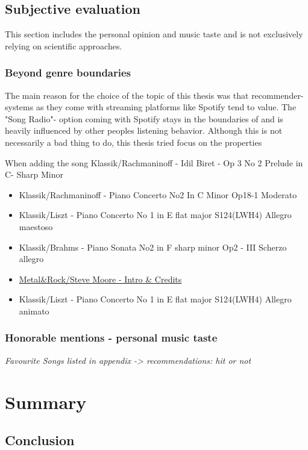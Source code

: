 \section{Subjective evaluation}

This section includes the personal opinion and music taste and is not exclusively relying on scientific approaches. 

\subsection{Beyond genre boundaries}

The main reason for the choice of the topic of this thesis was that recommender-systems as they come with streaming platforms like Spotify tend to value. The "Song Radio"- option coming with Spotify stays in the boundaries of and is heavily influenced by other peoples listening behavior. Although this is not necessarily a bad thing to do, this thesis tried focus on the properties 


When adding the song Klassik/Rachmaninoff - Idil Biret - Op 3 No 2 Prelude in C- Sharp Minor
\begin{itemize}
	\setlength\itemsep{-0.5em}
	\item Klassik/Rachmaninoff - Piano Concerto No2 In C Minor Op18-1 Moderato
	\item Klassik/Liszt - Piano Concerto No 1 in E flat major S124(LWH4) Allegro maestoso
	\item Klassik/Brahms - Piano Sonata No2 in F sharp minor Op2 - III Scherzo allegro
	\item \underline{Metal\&Rock/Steve Moore - Intro \& Credits}
	\item Klassik/Liszt - Piano Concerto No 1 in E flat major S124(LWH4) Allegro animato
\end{itemize}

\subsection{Honorable mentions - personal music taste}

\textit{Favourite Songs listed in appendix -> recommendations: hit or not}

\chapter{Summary}

\section{Conclusion}

